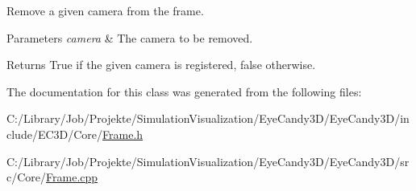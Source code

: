 Remove a given camera from the frame. 
\begin{DoxyParams}{Parameters}
{\em camera} & The camera to be removed. \\
\hline
\end{DoxyParams}
\begin{DoxyReturn}{Returns}
True if the given camera is registered, false otherwise. 
\end{DoxyReturn}


The documentation for this class was generated from the following files\+:\begin{DoxyCompactItemize}
\item 
C\+:/\+Library/\+Job/\+Projekte/\+Simulation\+Visualization/\+Eye\+Candy3\+D/\+Eye\+Candy3\+D/include/\+E\+C3\+D/\+Core/\mbox{\hyperlink{_frame_8h}{Frame.\+h}}\item 
C\+:/\+Library/\+Job/\+Projekte/\+Simulation\+Visualization/\+Eye\+Candy3\+D/\+Eye\+Candy3\+D/src/\+Core/\mbox{\hyperlink{_frame_8cpp}{Frame.\+cpp}}\end{DoxyCompactItemize}
